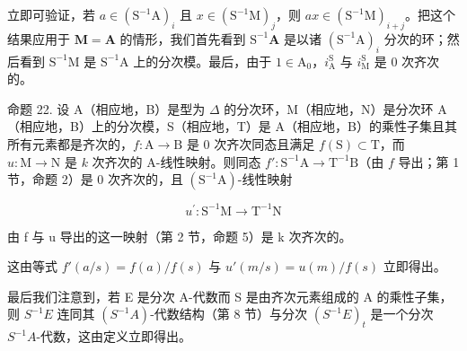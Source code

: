 立即可验证，若 \(a \in (\mathrm{S}^{-1}\mathrm{A})_i\) 且 \(x \in (\mathrm{S}^{-1}\mathrm{M})_j\)，则 \(ax \in (\mathrm{S}^{-1}\mathrm{M})_{i+j}\)。把这个结果应用于 \(\mathbf{M} = \mathbf{A}\) 的情形，我们首先看到 \(\mathrm{S}^{-1}\mathbf{A}\) 是以诸 \((\mathrm{S}^{-1}\mathrm{A})_i\) 分次的环；然后看到 \(\mathrm{S}^{-1}\mathrm{M}\) 是 \(\mathrm{S}^{-1}\mathrm{A}\) 上的分次模。最后，由于 \(1 \in \mathrm{A}_0\)，\(i_{\mathrm{A}}^{\mathrm{S}}\) 与 \(i_{\mathrm{M}}^{\mathrm{S}}\) 是 0 次齐次的。

命题 22. 设 A（相应地，B）是型为 \(\Delta\) 的分次环，M（相应地，N）是分次环 A（相应地，B）上的分次模，S（相应地，T）是 A（相应地，B）的乘性子集且其所有元素都是齐次的，\(f: \mathrm{A} \to \mathrm{B}\) 是 0 次齐次同态且满足 \(f(\mathrm{S}) \subset \mathrm{T}\)，而 \(u: \mathrm{M} \to \mathrm{N}\) 是 \(k\) 次齐次的 A-线性映射。则同态 \(f': \mathrm{S}^{-1}\mathrm{A} \to \mathrm{T}^{-1}\mathrm{B}\)（由 \(f\) 导出；第 1 节，命题 2）是 0 次齐次的，且 \((\mathrm{S}^{-1}\mathrm{A})\)-线性映射

\[
u ^ {\prime} \colon \mathrm{S} ^ {- 1} \mathrm{M} \rightarrow \mathrm{T} ^ {- 1} \mathrm{N}
\]

由 f 与 u 导出的这一映射（第 2 节，命题 5）是 k 次齐次的。

这由等式 \(f'(a / s) = f(a) / f(s)\) 与 \(u'(m / s) = u(m) / f(s)\) 立即得出。

最后我们注意到，若 E 是分次 A-代数而 S 是由齐次元素组成的 A 的乘性子集，则 \(S^{-1}E\) 连同其 \((S^{-1}A)\)-代数结构（第 8 节）与分次 \((S^{-1}E)_{t}\) 是一个分次 \(S^{-1}A\)-代数，这由定义立即得出。

